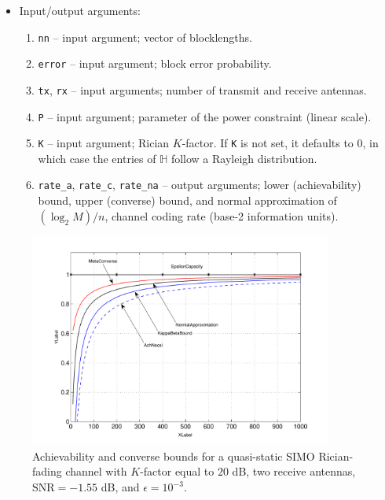 \documentclass[a4paper,11p]{memoir}
\begin{document}
\begin{itemize}
\item Input/output arguments:
\begin{enumerate}
\item \verb|nn| -- input argument; vector of blocklengths.
\item \verb|error| -- input argument; block error probability.
\item \verb|tx|, \verb|rx| -- input arguments; number of transmit and receive antennas.
\item \verb|P| -- input argument; parameter of the power constraint (linear scale).
\item \verb|K| -- input argument; Rician $K$-factor. If \verb|K| is not set, it defaults to $0$, in which case the entries of $\mathbb{H}$ follow a Rayleigh distribution.
\item \verb|rate_a|, \verb|rate_c|, \verb|rate_na| -- output arguments; lower (achievability) bound, upper (converse) bound, and normal approximation of  $(\log_2 M)/n$, channel coding rate (base-2 information units).
\end{enumerate}

\end{itemize}


\begin{figure}[t]
	\centering
	\includegraphics[height=7cm]{plots/quasi-static-simo.pdf}
\vspace{-1.5mm}
\caption{Achievability and converse bounds for a quasi-static SIMO Rician-fading channel with $K$-factor equal to $20$ dB, two receive antennas, $\text{SNR}=-1.55 $ dB, and $\epsilon=10^{-3}$. 
\label{fig:bounds-simo}}
\end{figure}
\end{document}
